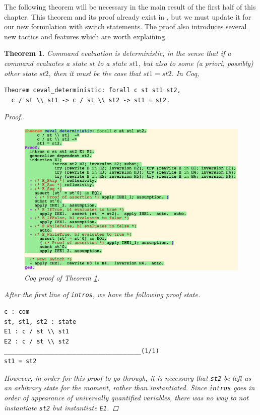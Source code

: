 \documentclass[12pt,notitlepage]{report}
\theoremstyle{plain}
\newtheorem{theo}{Theorem}[section]
\theoremstyle{definition}
\numberwithin{equation}{section}
\begin{document}
The following theorem will be necessary in the main result of the first half of this chapter.  This theorem and its proof already exist in \cite{Pier}, but we must update it for our new formulation with switch statements.  The proof also introduces several new tactics and features which are worth explaining.

\begin{theo}\label{deterministic}
Command evaluation is deterministic, in the sense that if a command evaluates a state $st$ to a state $st1$, but also to some (a priori, possibly) other state $st2$, then it must be the case that $st1 = st2$.  In Coq,
\begin{verbatim}
Theorem ceval_deterministic: forall c st st1 st2,
  c / st \\ st1 -> c / st \\ st2 -> st1 = st2.
\end{verbatim}
\begin{proof}
\noindent
\begin{figure}[H]
        \centering
        \includegraphics[scale=0.6]{ceval_deterministic}
        \caption{Coq proof of Theorem \ref{deterministic}.}
        \label{fig:deterministic}
        \end{figure}
After the first line of \verb$intros$, we have the following proof state.
\begin{verbatim}
c : com
st, st1, st2 : state
E1 : c / st \\ st1
E2 : c / st \\ st2
______________________________________(1/1)
st1 = st2
\end{verbatim}
However, in order for this proof to go through, it is necessary that \verb$st2$ be left as an arbitrary state for the moment, rather than instantiated.  Since \verb$intros$ goes in order of appearance of universally quantified variables, there was no way to not instantiate \verb$st2$ but instantiate \verb$E1$.  

\end{proof}
\end{theo}
\end{document}
